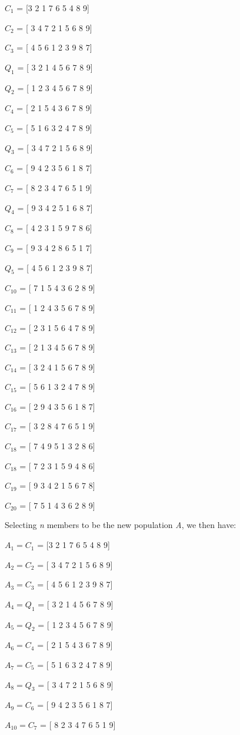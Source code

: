 $C_{1}$ = [3 2 1 7 6 5 4 8 9]\par 
$C_{2}$ = [ 3 4 7 2 1 5 6 8 9] \par 
$C_{3}$ = [ 4 5 6 1 2 3 9 8 7] \par 
$Q_1$ = [ 3 2 1 4 5 6 7 8 9] \par 
$Q_2$ = [ 1 2 3 4 5 6 7 8 9] \par 
$C_{4}$ = [ 2 1 5 4 3 6 7 8 9] \par
$C_{5}$ = [ 5 1 6 3 2 4 7 8 9] \par 
$Q_3$ = [ 3 4 7 2 1 5 6 8 9] \par 
$C_{6}$ = [ 9 4 2 3 5 6 1 8 7] \par 
$C_{7}$ = [ 8 2 3 4 7 6 5 1 9] \par 
$Q_4$ = [ 9 3 4 2 5 1 6 8 7] \par 
$C_{8}$ = [ 4 2 3 1 5 9 7 8 6] \par 
$C_{9}$ = [ 9 3 4 2 8 6 5 1 7] \par
$Q_5$ = [ 4 5 6 1 2 3 9 8 7] \par 
$C_{10}$ = [ 7 1 5 4 3 6 2 8 9] \par 
$C_{11}$ = [ 1 2 4 3 5 6 7 8 9] \par 
$C_{12}$ = [ 2 3 1 5 6 4 7 8 9] \par 
$C_{13}$ = [ 2 1 3 4 5 6 7 8 9] \par 
$C_{14}$ = [ 3 2 4 1 5 6 7 8 9] \par 
$C_{15}$ = [ 5 6 1 3 2 4 7 8 9] \par 
$C_{16}$ = [ 2 9 4 3 5 6 1 8 7] \par 
$C_{17}$ = [ 3 2 8 4 7 6 5 1 9] \par 
$C_{18}$ = [ 7 4 9 5 1 3 2 8 6] \par 
$C_{18}$ = [ 7 2 3 1 5 9 4 8 6] \par 
$C_{19}$ = [ 9 3 4 2 1 5 6 7 8] \par
$C_{20}$ = [ 7 5 1 4 3 6 2 8 9] \par 

Selecting \emph{n} members to be the new population \emph{A}, we then have: \par 
$A_1 = C_{1}$ = [3 2 1 7 6 5 4 8 9]\par 
$A_2 = C_{2}$ = [ 3 4 7 2 1 5 6 8 9] \par 
$A_3 = C_{3}$ = [ 4 5 6 1 2 3 9 8 7] \par 
$A_4 = Q_1$ = [ 3 2 1 4 5 6 7 8 9] \par 
$A_ 5 = Q_2$ = [ 1 2 3 4 5 6 7 8 9] \par 
$A_6 = C_{4}$ = [ 2 1 5 4 3 6 7 8 9] \par
$A_7 = C_{5}$ = [ 5 1 6 3 2 4 7 8 9] \par 
$A_8 = Q_3$ = [ 3 4 7 2 1 5 6 8 9] \par 
$A_9 = C_{6}$ = [ 9 4 2 3 5 6 1 8 7] \par 
$A_10 = C_{7}$ = [ 8 2 3 4 7 6 5 1 9] \par


